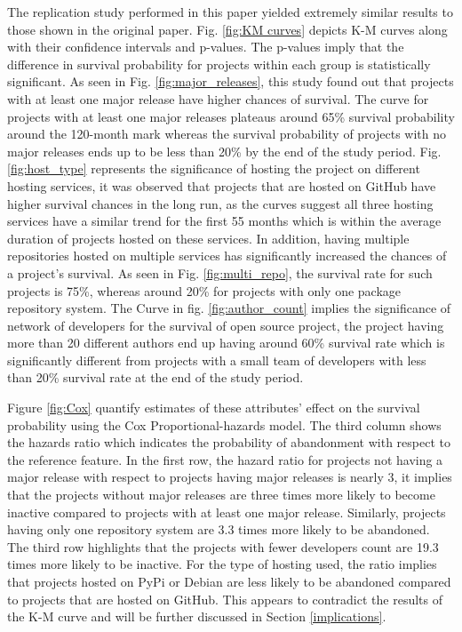 \documentclass[acmconf]{acmart}
\begin{document}
The replication study performed in this paper yielded extremely similar results to those shown in the original paper. 
Fig. \ref{fig:KM curves} depicts K-M curves along with their confidence intervals and p-values. 
The p-values imply that the difference in survival probability for projects within each group is statistically significant.
As seen in Fig. \ref{fig:major_releases}, this study found out that projects with at least one major release have higher chances of survival. 
The curve for projects with at least one major releases plateaus around 65\% survival probability around the 120-month mark whereas the survival probability of projects with no major releases ends up to be less than 20\% by the end of the study period. 
Fig. \ref{fig:host_type} represents the significance of hosting the project on different hosting services, it was observed that projects that are hosted on GitHub have higher survival chances in the long run, as the curves suggest all three hosting services have a similar trend for the first 55 months which is within the average duration of projects hosted on these services.
In addition, having multiple repositories hosted on multiple services has significantly increased the chances of a project's survival.
As seen in Fig. \ref{fig:multi_repo}, the survival rate for such projects is 75\%, whereas around 20\% for projects with only one package repository system. 
The Curve in fig. \ref{fig:author_count} implies the significance of network of developers for the survival of open source project, the project having more than 20 different authors end up having around 60\% survival rate which is significantly different from projects with a small team of developers with less than 20\% survival rate at the end of the study period.

Figure \ref{fig:Cox} quantify estimates of these attributes' effect on the survival probability using the Cox Proportional-hazards model. 
The third column shows the hazards ratio which indicates the probability of abandonment with respect to the reference feature.
In the first row, the hazard ratio for projects not having a major release with respect to projects having major releases is nearly 3, it implies that the projects without major releases are three times more likely to become inactive compared to projects with at least one major release. 
Similarly, projects having only one repository system are 3.3 times more likely to be abandoned.
The third row highlights that the projects with fewer developers count are 19.3 times more likely to be inactive.
For the type of hosting used, the ratio implies that projects hosted on PyPi or Debian are less likely to be abandoned compared to projects that are hosted on GitHub. 
This appears to contradict the results of the K-M curve and will be further discussed in Section \ref{implications}.
\end{document}
